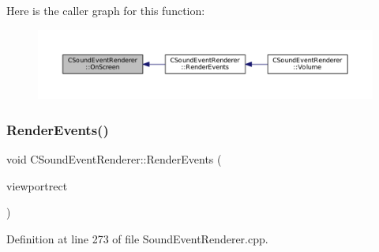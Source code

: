 Here is the caller graph for this function\+:
\nopagebreak
\begin{figure}[H]
\begin{center}
\leavevmode
\includegraphics[width=350pt]{classCSoundEventRenderer_a9df97d476a3a39cb7126db9c366c2f0c_icgraph}
\end{center}
\end{figure}
\hypertarget{classCSoundEventRenderer_aa8b0c3029ea920ae4f4a08b9d9dd1c9c}{}\label{classCSoundEventRenderer_aa8b0c3029ea920ae4f4a08b9d9dd1c9c} 
\subsubsection{\texorpdfstring{Render\+Events()}{RenderEvents()}}
{\footnotesize\ttfamily void C\+Sound\+Event\+Renderer\+::\+Render\+Events (\begin{DoxyParamCaption}\item[{const \hyperlink{structSRectangle}{S\+Rectangle} \&}]{viewportrect }\end{DoxyParamCaption})}



Definition at line 273 of file Sound\+Event\+Renderer.\+cpp.


